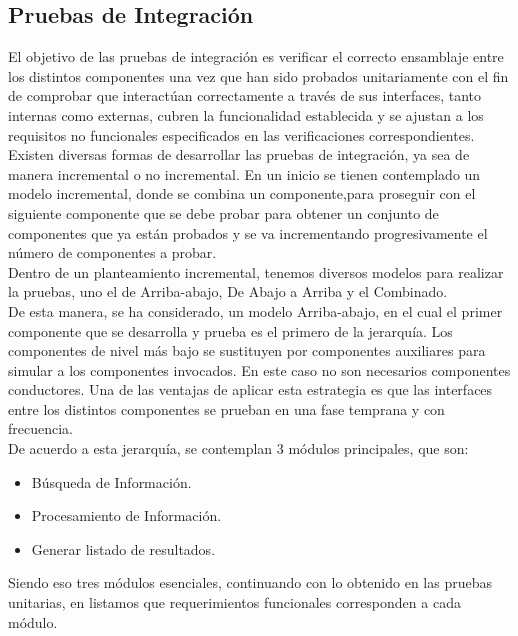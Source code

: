 \subsection{Pruebas de Integración}{

\noindent El objetivo de las pruebas de integración es verificar el correcto ensamblaje entre los distintos componentes una vez que han sido probados unitariamente con el fin de comprobar que interactúan correctamente a través de sus interfaces, tanto internas como externas, cubren la funcionalidad establecida y se ajustan a los requisitos no funcionales especificados en las verificaciones correspondientes.\\

\noindent Existen diversas formas de desarrollar las pruebas de integración, ya sea de manera incremental o no incremental. En un inicio se tienen contemplado un modelo incremental, donde se combina  un componente,para proseguir con el siguiente componente que se debe probar para obtener un  conjunto de componentes que ya están probados y se va incrementando progresivamente el número de componentes a probar.\\

\noindent Dentro de un planteamiento incremental, tenemos diversos modelos para realizar la pruebas, uno el de Arriba-abajo, De Abajo a Arriba y el Combinado.\\

\noindent De esta manera, se ha considerado, un modelo Arriba-abajo, en el cual el primer componente que se desarrolla y prueba es el primero de la jerarquía. Los componentes de nivel más bajo se sustituyen por componentes auxiliares para simular a los componentes invocados. En este caso no son necesarios componentes conductores. Una de las ventajas de aplicar esta estrategia es que las interfaces entre los distintos componentes se prueban en una fase temprana y con frecuencia.\\

\noindent De acuerdo a esta jerarquía, se contemplan 3 módulos principales, que son:

\begin{itemize}
    \item Búsqueda de Información.
    \item Procesamiento de Información.
    \item Generar listado de resultados.
\end{itemize}

\noindent Siendo eso tres módulos esenciales, continuando con lo obtenido en las pruebas unitarias, en listamos que requerimientos funcionales corresponden a cada módulo.

}
